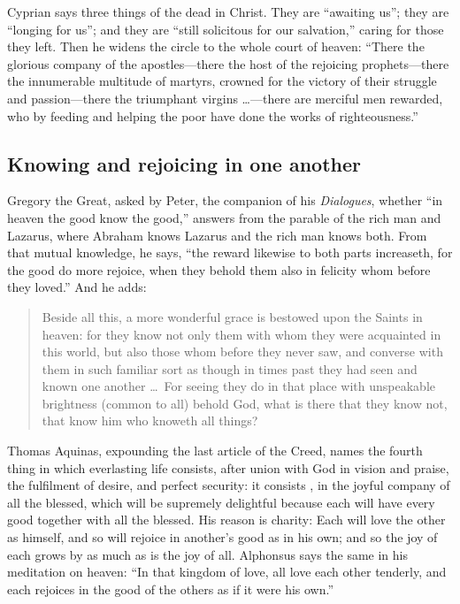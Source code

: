 Cyprian says three things of the dead in Christ. They are ``awaiting us''; they are ``longing for us''; and they are ``still solicitous for our salvation,'' caring for those they left. Then he widens the circle to the whole court of heaven: ``There the glorious company of the apostles---there the host of the rejoicing prophets---there the innumerable multitude of martyrs, crowned for the victory of their struggle and passion---there the triumphant virgins \ldots---there are merciful men rewarded, who by feeding and helping the poor have done the works of righteousness.''

\subsection{Knowing and rejoicing in one another}

Gregory the Great, asked by Peter, the companion of his \emph{Dialogues}, whether ``in heaven the good know the good,'' answers from the parable of the rich man and Lazarus, where Abraham knows Lazarus and the rich man knows both. From that mutual knowledge, he says, ``the reward likewise to both parts increaseth, for the good do more rejoice, when they behold them also in felicity whom before they loved.'' And he adds:

\begin{quote}
Beside all this, a more wonderful grace is bestowed upon the Saints in heaven: for they know not only them with whom they were acquainted in this world, but also those whom before they never saw, and converse with them in such familiar sort as though in times past they had seen and known one another \ldots\ For seeing they do in that place with unspeakable brightness (common to all) behold God, what is there that they know not, that know him who knoweth all things?
\end{quote}


Thomas Aquinas, expounding the last article of the Creed, names the fourth thing in which everlasting life consists, after union with God in vision and praise, the fulfilment of desire, and perfect security: it consists , in the joyful company of all the blessed, which will be supremely delightful because each will have every good together with all the blessed. His reason is charity:  Each will love the other as himself, and so will rejoice in another's good as in his own; and so the joy of each grows by as much as is the joy of all. Alphonsus says the same in his meditation on heaven: ``In that kingdom of love, all love each other tenderly, and each rejoices in the good of the others as if it were his own.''

